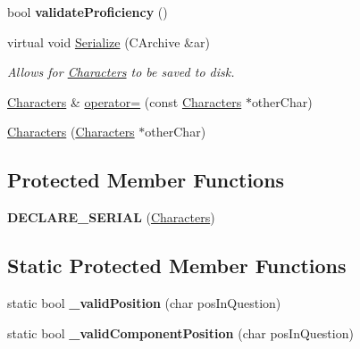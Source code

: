 \begin{DoxyCompactItemize}
\hypertarget{class_characters_a8a13cb967bd25662f86eac505e3e874a}{}\label{class_characters_a8a13cb967bd25662f86eac505e3e874a} 
bool {\bfseries validate\+Proficiency} ()
\item 
\hypertarget{class_characters_ad8eafe3c0b8b2138dc28f4d52050d434}{}\label{class_characters_ad8eafe3c0b8b2138dc28f4d52050d434} 
virtual void \hyperlink{class_characters_ad8eafe3c0b8b2138dc28f4d52050d434}{Serialize} (C\+Archive \&ar)
\begin{DoxyCompactList}\small\item\em Allows for \hyperlink{class_characters}{Characters} to be saved to disk. \end{DoxyCompactList}\item 
\hyperlink{class_characters}{Characters} \& \hyperlink{class_characters_a161bd4230b1ff594c36db697ee2d3707}{operator=} (const \hyperlink{class_characters}{Characters} $\ast$other\+Char)
\item 
\hyperlink{class_characters_a695ed5b59463f54d4eb52a551a25949b}{Characters} (\hyperlink{class_characters}{Characters} $\ast$other\+Char)
\end{DoxyCompactItemize}
\subsection*{Protected Member Functions}
\begin{DoxyCompactItemize}
\item 
\hypertarget{class_characters_ad71f0049d5bcf2d9c67278c237ad441b}{}\label{class_characters_ad71f0049d5bcf2d9c67278c237ad441b} 
{\bfseries D\+E\+C\+L\+A\+R\+E\+\_\+\+S\+E\+R\+I\+AL} (\hyperlink{class_characters}{Characters})
\end{DoxyCompactItemize}
\subsection*{Static Protected Member Functions}
\begin{DoxyCompactItemize}
\item 
\hypertarget{class_characters_ab509433a15fb7604b2080e0568e41d0d}{}\label{class_characters_ab509433a15fb7604b2080e0568e41d0d} 
static bool {\bfseries \+\_\+valid\+Position} (char pos\+In\+Question)
\item 
\hypertarget{class_characters_af2c85f79c62aba2dbf3e8d77e20ffb52}{}\label{class_characters_af2c85f79c62aba2dbf3e8d77e20ffb52} 
static bool {\bfseries \+\_\+valid\+Component\+Position} (char pos\+In\+Question)
\end{DoxyCompactItemize}
